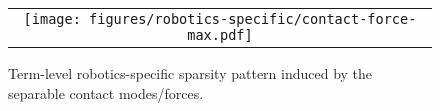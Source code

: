 
\begin{figure}[htbp]
    \centering
    \begin{minipage}{\columnwidth}
        \centering
        \begin{tabular}{c}

            \begin{minipage}{0.45\columnwidth}
                \centering
                \texttt{[image: figures/robotics-specific/contact-force-max.pdf]}
            \end{minipage}

        \end{tabular}
    \end{minipage}

    \caption{Term-level robotics-specific sparsity pattern induced by the separable contact modes/forces.
    \label{fig:rs:term-level}}

    \vspace{-6mm}

\end{figure}